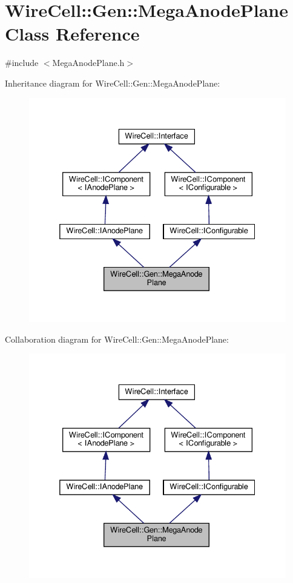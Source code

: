 \hypertarget{class_wire_cell_1_1_gen_1_1_mega_anode_plane}{}\section{Wire\+Cell\+:\+:Gen\+:\+:Mega\+Anode\+Plane Class Reference}
\label{class_wire_cell_1_1_gen_1_1_mega_anode_plane}


{\ttfamily \#include $<$Mega\+Anode\+Plane.\+h$>$}



Inheritance diagram for Wire\+Cell\+:\+:Gen\+:\+:Mega\+Anode\+Plane\+:
\nopagebreak
\begin{figure}[H]
\begin{center}
\leavevmode
\includegraphics[width=332pt]{class_wire_cell_1_1_gen_1_1_mega_anode_plane__inherit__graph}
\end{center}
\end{figure}


Collaboration diagram for Wire\+Cell\+:\+:Gen\+:\+:Mega\+Anode\+Plane\+:
\nopagebreak
\begin{figure}[H]
\begin{center}
\leavevmode
\includegraphics[width=332pt]{class_wire_cell_1_1_gen_1_1_mega_anode_plane__coll__graph}
\end{center}
\end{figure}
